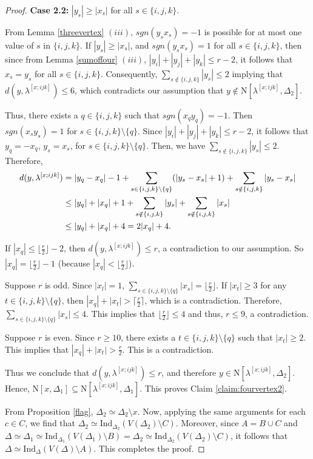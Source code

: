 \documentclass[10pt,a4paper]{amsart}
\def\n{{\mathrm{N}}}
\newcommand{\D}{\Delta}
\newcommand{\cil}{\lceil\frac{r}{2}\rceil}
\newcommand{\f}{\lfloor\frac{r}{2}\rfloor}
\begin{document}
\begin{proof}
	
	
	
    \smallskip
	\noindent \textbf{Case 2.2:} $|y_s|\geq |x_s|$ for all $s\in\{i,j,k\}$. 
	
	
	From Lemma \ref{threevertex} $(iii)$, $sgn(y_sx_s)=-1$ is possible for at most one value of $s$ in $\{i,j,k\}$. 
	If $|y_s|\geq |x_s|$, and $sgn(y_sx_s)=1$ for all $s\in \{i,j,k\}$, then since from Lemma \ref{sumoffour} $(iii)$,   $|y_i|+|y_j|+|y_k|\leq r-2$, it follows that $x_s=y_s$ for all $s\in \{i,j,k\}$. Consequently, $\sum_{s\notin\{i,j,k\}}|y_s|\leq 2$ implying that $d(y,\lambda^{[x;ijk]})\leq 6$, which contradicts our assumption that $y\notin \n[\lambda^{[x;ijk]},\D_2]$.  
	
	Thus, there exists a $q\in\{i,j,k\}$ such that $sgn(x_qy_q)=-1$. Then $sgn(x_sy_s)=1$ for $s\in\{i,j,k\}\setminus\{q\}$. Since $|y_i|+|y_j|+|y_k|\leq r-2$, it follows that $y_q=-x_q$, $y_s=x_s$, for $s\in\{i,j,k\}\setminus\{q\}$. Then, we have $\sum_{s\notin\{i,j,k\}}|y_s|\leq 2$. Therefore, 
	\begin{align}
		d(y,\lambda^{[x;ijk]})&=|y_q-x_q|-1+\sum_{s\in\{i,j,k\}\setminus\{q\}}(|y_s-x_s|+1)+\sum_{s\notin\{i,j,k\}}|y_s-x_s| \notag
		\\
		&\leq |y_q|+|x_q|+1+\sum_{s\notin\{i,j,k\}}|y_s|+\sum_{s\notin\{i,j,k\}}|x_s| \notag
		\\
		&\leq |y_q|+|x_q|+4 = 2|x_q|+4. \label{eq3}
	\end{align}
	
	If $|x_q|  \leq \f-2 $, then  $d(y,\lambda^{[x;ijk]}) \leq r$, a contradiction to our assumption. So   $|x_q|=\f-1$ (because $|x_q|< \f$). 
	
	Suppose $r$ is odd. Since $|x_l|=1$,  $\sum_{s \in \{i, j, k\}\setminus \{q\}} |x_s|=\f$. If $|x_t|\geq 3$ for any $t\in \{i, j, k\}\setminus \{q\}$, then $|x_q|+|x_t|>\cil$, which is a contradiction. Therefore,  $\sum_{s \in \{i, j, k\}\setminus \{q\}} |x_s|\leq 4$. This implies that $\f\leq 4$ and thus, $r\leq 9$, a contradiction. 
	
	Suppose $r$ is even. Since $r\geq 10$, there exists a $t\in\{i,j,k\}\setminus \{q\}$ such that $|x_t|\geq 2$. This implies that $|x_q|+|x_t|>\frac{r}{2}$. This is a contradiction.
		
	Thus we conclude that $d(y, \lambda^{[x;ijk]}) \leq r$, and therefore $y \in \n[\lambda^{[x;ijk]}, \D_2]$. 
	Hence, $\n[x,\D_1]\subseteq \n[\lambda^{[x;ijk]},\D_1]$. This proves Claim \ref{claim:fourvertex2}.  
	
	
	From Proposition \ref{flag}, $\D_2\simeq \D_2 \setminus x$. Now, applying the same arguments for each $c\in C$, we find that $\D_2\simeq \mathrm{Ind}_{\D_2}(V(\D_2)\setminus C)$. Moreover, since $A=B\cup C$ and $\D\simeq \D_1\simeq \mathrm{Ind}_{\D_1}(V(\D_1)\setminus B)= \D_2\simeq \mathrm{Ind}_{\D_2}(V(\D_2)\setminus C)$, it follows that $\D\simeq \mathrm{Ind}_{\D}(V(\D)\setminus A)$. This completes the proof.
\end{proof}
\end{document}
